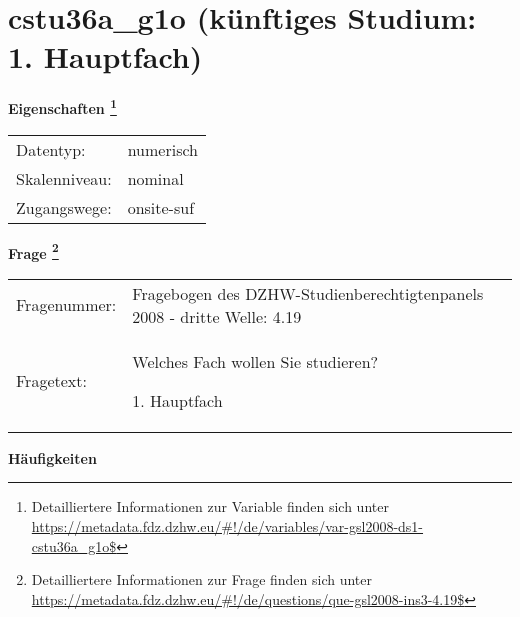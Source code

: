 
    \setcounter{footnote}{0}

    \vspace*{-1.8cm}
	\section{cstu36a\_g1o (künftiges Studium: 1. Hauptfach)}
	\label{section:cstu36a_g1o}



    \vspace*{0.5cm}
    \noindent\textbf{Eigenschaften
	\footnote{Detailliertere Informationen zur Variable finden sich unter
		\url{https://metadata.fdz.dzhw.eu/\#!/de/variables/var-gsl2008-ds1-cstu36a_g1o$}}}\\
	\begin{tabularx}{\hsize}{@{}lX}
	Datentyp: & numerisch \\
	Skalenniveau: & nominal \\
	Zugangswege: &
	  onsite-suf
 \\
    \end{tabularx}



				\vspace*{0.5cm}
                \noindent\textbf{Frage
	                \footnote{Detailliertere Informationen zur Frage finden sich unter
		              \url{https://metadata.fdz.dzhw.eu/\#!/de/questions/que-gsl2008-ins3-4.19$}}}\\
				\begin{tabularx}{\hsize}{@{}lX}
					Fragenummer: &
					  Fragebogen des DZHW-Studienberechtigtenpanels 2008 - dritte Welle:
					  4.19
 \\
					Fragetext: & Welches Fach wollen Sie studieren?\par  1. Hauptfach \\
				\end{tabularx}





        		\vspace*{0.5cm}
                \noindent\textbf{Häufigkeiten}

